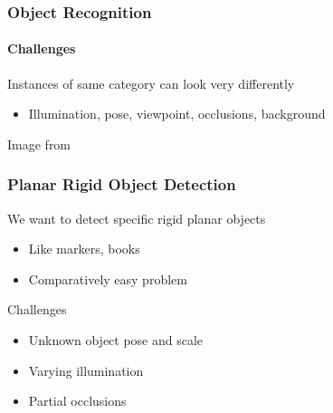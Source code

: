 \documentclass[xetex,professionalfont]{beamer}
\begin{document}

\begin{frame}
\frametitle{Object Recognition}
\framesubtitle{Challenges}

Instances of same category can look very differently
\begin{itemize}
    \item Illumination, pose, viewpoint, occlusions, background
\end{itemize}

\medskip
\begin{center}
    {\centering Image from \cite{grauman2011}}
\end{center}

\end{frame}


{
\begin{frame}


\end{frame}
}


\begin{frame}
\frametitle{Planar Rigid Object Detection}

We want to detect specific rigid planar objects
\begin{itemize}
    \item Like markers, books
	\item Comparatively easy problem
\end{itemize}

\bigskip
Challenges
\begin{itemize}
	\item Unknown object pose and scale
	\item Varying illumination
    \item Partial occlusions
\end{itemize}

\end{frame}
\end{document}
